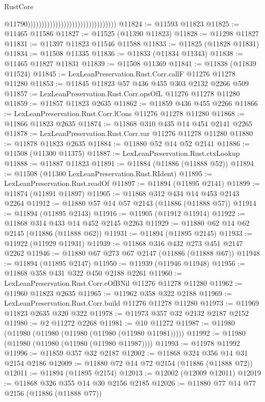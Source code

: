 \begin{lexlean}{RustCore}
\begin{coremodule}
                                                                    @11790))))))))))))))))))))))))))))))))
@11824 := @11593 @11823
@11825 := @11465 @11586
@11827 := @11525 (@11390 @11823)
@11828 := @11298 @11827
@11831 := @11397 @11823 @11546 @11588
@11833 := @11825 (@11828 @11831)
@11834 := @11508 @11335
@11836 := @11833 (@11834 @11343)
@11838 := @11465 @11827 @11831
@11839 := @11508 @11369
@11841 := @11838 (@11839 @11524)
@11845 := LexLeanPreservation.Rust.Corr.callF @11276 @11278 @11280
@11853 := @11845 @11823 @57 @436 @455 @303 @2132 @2266 @509
@11857 := LexLeanPreservation.Rust.Corr.opsOfL @11276 @11278 @11280
@11859 := @11857 @11823 @2635
@11862 := @11859 @436 @455 @2266
@11866 := LexLeanPreservation.Rust.Corr.lCons @11276 @11278 @11280
@11868 := @11866 @11823 @2635
@11874 := @11868 @310 @435 @14 @454 @2141 @2265
@11878 := LexLeanPreservation.Rust.Corr.var @11276 @11278 @11280
@11880 := @11878 @11823 @2635
@11884 := @11880 @52 @14 @52 @2141
@11886 := @11508 (@11300 @11375)
@11887 := LexLeanPreservation.Rust.ctxLookup
@11888 := @11887 @11823
@11891 := @11884 (@11886 (@11888 @52))
@11894 := @11508 (@11300 LexLeanPreservation.Rust.RIdent)
@11895 := LexLeanPreservation.Rust.readOf
@11897 := @11894 (@11895 @2141)
@11899 := @11874 (@11891 @11897)
@11905 := @11868 @312 @434 @14 @453 @2143 @2264
@11912 := @11880 @57 @14 @57 @2143 (@11886 (@11888 @57))
@11914 := @11894 (@11895 @2143)
@11916 := @11905 (@11912 @11914)
@11922 := @11868 @314 @433 @14 @452 @2145 @2263
@11929 := @11880 @62 @14 @62 @2145 (@11886 (@11888 @62))
@11931 := @11894 (@11895 @2145)
@11933 := @11922 (@11929 @11931)
@11939 := @11868 @316 @432 @273 @451 @2147 @2262
@11946 := @11880 @67 @273 @67 @2147 (@11886 (@11888 @67))
@11948 := @11894 (@11895 @2147)
@11950 := @11939 (@11946 @11948)
@11956 := @11868 @358 @431 @322 @450 @2188 @2261
@11960 := LexLeanPreservation.Rust.Corr.eOfBNil @11276 @11278 @11280
@11962 := @11960 @11823 @2635
@11965 := @11962 @358 @322 @2188
@11969 := LexLeanPreservation.Rust.Corr.build @11276 @11278 @11280
@11973 := @11969 @11823 @2635 @320 @322
@11978 := @11973 @357 @32 @2132 @2187 @2152
@11980 := @2 @11272 @2268
@11981 := @10 @11272
@11987 := @11980 (@11980 (@11980 (@11980 (@11980 (@11980 @11981)))))
@11992 := @11980 (@11980 (@11980 (@11980 (@11980 @11987))))
@11993 := @11978 @11992
@11996 := @11859 @357 @32 @2187
@12002 := @11868 @324 @356 @14 @31 @2154 @2186
@12009 := @11880 @72 @14 @72 @2154 (@11886 (@11888 @72))
@12011 := @11894 (@11895 @2154)
@12013 := @12002 (@12009 @12011)
@12019 := @11868 @326 @355 @14 @30 @2156 @2185
@12026 := @11880 @77 @14 @77 @2156 (@11886 (@11888 @77))

\end{coremodule}
\end{lexlean}
